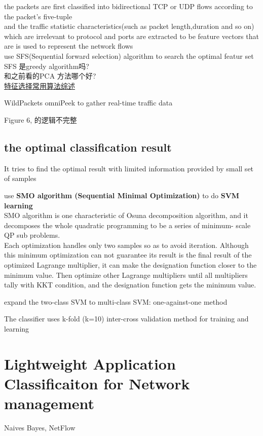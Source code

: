 \documentclass{article}
\begin{document}
the packets are first classified into bidirectional TCP or UDP flows according to the packet's five-tuple\\
and the traffic statistic characteristics(such as packet length,duration and so on) which are irrelevant to protocol and ports are extracted to be feature vectors that are is used to represent the network flows\\
use SFS(Sequential forward selection) algorithm to search the optimal featur set\\
SFS 是greedy algorithm吗?\\
和之前看的PCA 方法哪个好?\\
\href{http://www.cnblogs.com/heaad/archive/2011/01/02/1924088.html}{特征选择常用算法综述}

WildPackets omniPeek to gather real-time traffic data

Figure 6, 的逻辑不完整

\subsection{the optimal classification result}\label{the-optimal-classification-result}
It tries to find the optimal result with limited information provided by small set of samples

use \textbf{SMO algorithm (Sequential Minimal Optimization)} to do \textbf{SVM learning}\\
SMO algorithm is one characteristic of Osuna decomposition algorithm, and it decomposes the whole quadratic programming to be a series of minimum- scale QP sub problems.\\
Each optimization handles only two samples so as to avoid iteration. Although this minimum optimization can not guarantee its result is the final result of the optimized Lagrange multiplier, it can make the designation function closer to the minimum value. Then optimize other Lagrange multipliers until all multipliers tally with KKT condition, and the designation function gets the minimum value.

expand the two-class SVM to multi-class SVM: one-against-one method

The classifier uses k-fold (k=10) inter-cross validation method for training and learning

\section{Lightweight Application Classificaiton for Network management}
Naives Bayes, NetFlow
\end{document}
